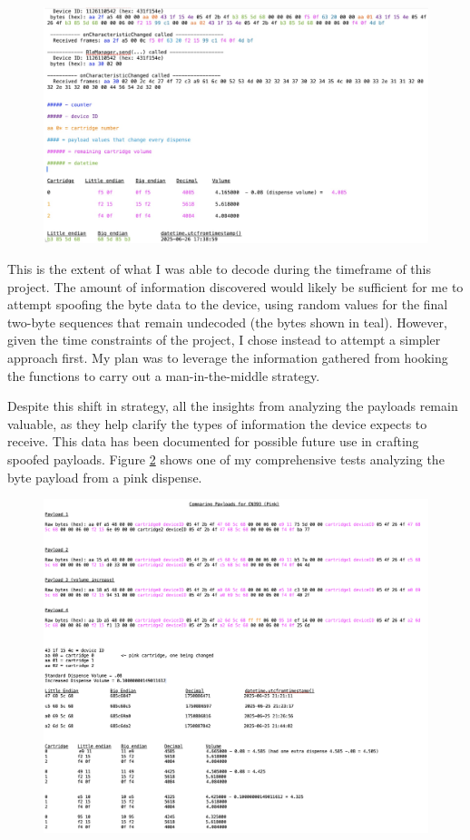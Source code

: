 \begin{figure}[H]
	\centering
	\includegraphics[width=0.7\linewidth]{payload6}
	\caption{}
	\label{fig:payload6}
\end{figure}

This is the extent of what I was able to decode during the timeframe of this project. The amount of information discovered would likely be sufficient for me to attempt spoofing the byte data to the device, using random values for the final two-byte sequences that remain undecoded (the bytes shown in teal). However, given the time constraints of the project, I chose instead to attempt a simpler approach first. My plan was to leverage the information gathered from hooking the functions to carry out a man-in-the-middle strategy.

Despite this shift in strategy, all the insights from analyzing the payloads remain valuable, as they help clarify the types of information the device expects to receive. This data has been documented for possible future use in crafting spoofed payloads. Figure \ref{fig:bigpayload} shows one of my comprehensive tests analyzing the byte payload from a pink dispense.

\begin{figure}[H]
	\centering
	\includegraphics[scale=.3]{bigpayload}
	\caption{}
	\label{fig:bigpayload}
\end{figure}


